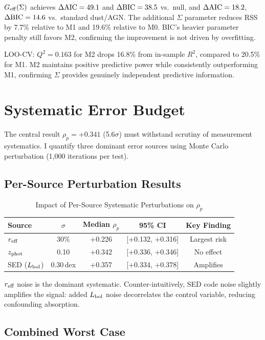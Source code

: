 \documentclass[apj,twocolumn,longbibliography,linenumbers]{aastex701}
\begin{document}
$G_{\rm eff}(\Sigma)$ achieves $\Delta{\rm AIC} = 49.1$ and $\Delta{\rm BIC} = 38.5$ vs.\ null, and $\Delta{\rm AIC} = 18.2$, $\Delta{\rm BIC} = 14.6$ vs.\ standard dust/AGN. The additional $\Sigma$ parameter reduces RSS by 7.7\% relative to M1 and 19.6\% relative to M0. BIC's heavier parameter penalty still favors M2, confirming the improvement is not driven by overfitting.

LOO-CV: $Q^2 = 0.163$ for M2 drops 16.8\% from in-sample $R^2$, compared to 20.5\% for M1. M2 maintains positive predictive power while consistently outperforming M1, confirming $\Sigma$ provides genuinely independent predictive information.

\section{Systematic Error Budget}

The central result $\rho_p = +0.341$ (5.6$\sigma$) must withstand scrutiny of measurement systematics. I quantify three dominant error sources using Monte Carlo perturbation (1,000 iterations per test).

\subsection{Per-Source Perturbation Results}

\begin{table}[h]
\caption{Impact of Per-Source Systematic Perturbations on $\rho_p$}
\label{tab:mc_perturbation}
\centering
\footnotesize
\begin{tabular}{lcccc}
\hline
Source & $\sigma$ & Median $\rho_p$ & 95\% CI & Key Finding \\
\hline
$r_{\rm eff}$ & 30\% & +0.226 & [+0.132, +0.316] & Largest risk \\
$z_{\rm phot}$ & 0.10 & +0.342 & [+0.336, +0.346] & No effect \\
SED ($L_{\rm bol}$) & 0.30\,dex & +0.357 & [+0.334, +0.378] & Amplifies \\
\hline
\end{tabular}
\end{table}

$r_{\rm eff}$ noise is the dominant systematic. Counter-intuitively, SED code noise slightly amplifies the signal: added $L_{\rm bol}$ noise decorrelates the control variable, reducing confounding absorption.

\subsection{Combined Worst Case}
\end{document}
